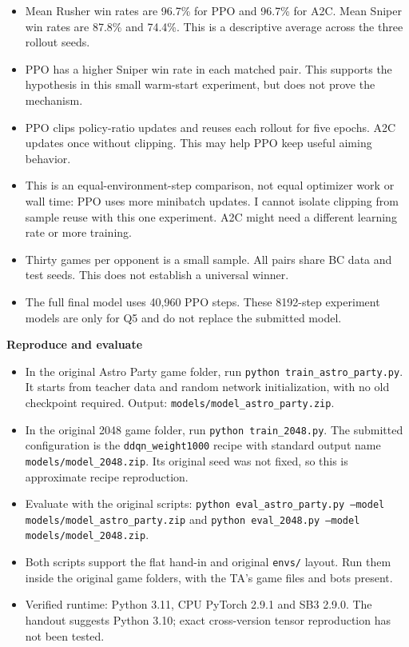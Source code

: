 \documentclass[a4paper]{article}
\begin{document}
\newpage
\begin{answer}
\begin{itemize}
\item Mean Rusher win rates are 96.7\% for PPO and 96.7\% for A2C. Mean Sniper win rates are 87.8\% and 74.4\%. This is a descriptive average across the three rollout seeds.
\item PPO has a higher Sniper win rate in each matched pair. This supports the hypothesis in this small warm-start experiment, but does not prove the mechanism.
\item PPO clips policy-ratio updates and reuses each rollout for five epochs. A2C updates once without clipping. This may help PPO keep useful aiming behavior.
\item This is an equal-environment-step comparison, not equal optimizer work or wall time: PPO uses more minibatch updates. I cannot isolate clipping from sample reuse with this one experiment. A2C might need a different learning rate or more training.
\item Thirty games per opponent is a small sample. All pairs share BC data and test seeds. This does not establish a universal winner.
\item The full final model uses 40,960 PPO steps. These 8192-step experiment models are only for Q5 and do not replace the submitted model.
\end{itemize}
\textbf{Reproduce and evaluate}
\begin{itemize}
\item In the original Astro Party game folder, run \texttt{python train\_astro\_party.py}. It starts from teacher data and random network initialization, with no old checkpoint required. Output: \texttt{models/model\_astro\_party.zip}.
\item In the original 2048 game folder, run \texttt{python train\_2048.py}. The submitted configuration is the \texttt{ddqn\_weight1000} recipe with standard output name \texttt{models/model\_2048.zip}. Its original seed was not fixed, so this is approximate recipe reproduction.
\item Evaluate with the original scripts: \texttt{python eval\_astro\_party.py --model models/model\_astro\_party.zip} and \texttt{python eval\_2048.py --model models/model\_2048.zip}.
\item Both scripts support the flat hand-in and original \texttt{envs/} layout. Run them inside the original game folders, with the TA's game files and bots present.
\item Verified runtime: Python 3.11, CPU PyTorch 2.9.1 and SB3 2.9.0. The handout suggests Python 3.10; exact cross-version tensor reproduction has not been tested.

\end{itemize}
\end{answer}
\end{document}
